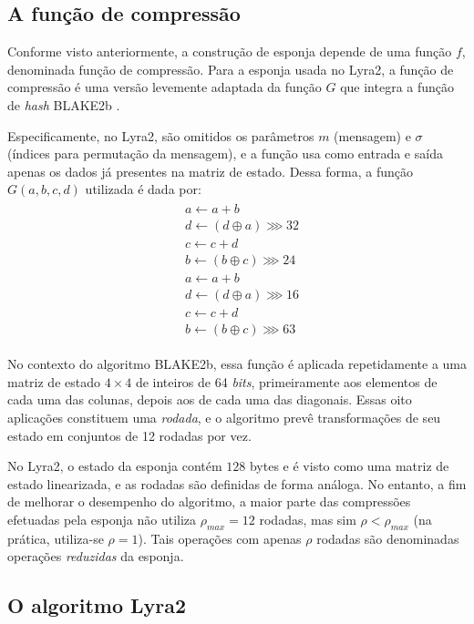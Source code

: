 \documentclass{article}
\begin{document}
\subsection{A função de compressão}\label{sec-compression-fn}

Conforme visto anteriormente, a construção de esponja depende de uma função
$f$, denominada função de compressão. Para a esponja usada no Lyra2, a função
de compressão é uma versão levemente adaptada da função $G$ que integra a
função de \emph{hash} BLAKE2b \cite{blake2b}.

Especificamente, no Lyra2, são omitidos os parâmetros $m$ (mensagem) e $\sigma$
(índices para permutação da mensagem), e a função usa como entrada e saída
apenas os dados já presentes na matriz de estado. Dessa forma, a função $G(a,
b, c, d)$ utilizada é dada por:
\begin{align*}
\begin{split}
& a \leftarrow a + b \\
& d \leftarrow \left(d \oplus a \right) \ggg 32 \\
& c \leftarrow c + d \\
& b \leftarrow \left(b \oplus c \right) \ggg 24 \\
& a \leftarrow a + b \\
& d \leftarrow \left(d \oplus a \right) \ggg 16 \\
& c \leftarrow c + d \\
& b \leftarrow \left(b \oplus c \right) \ggg 63
\end{split}
\end{align*}

No contexto do algoritmo BLAKE2b, essa função é aplicada repetidamente a
uma matriz de estado $4 \times 4$ de inteiros de 64 \emph{bits},
primeiramente aos elementos de cada uma das colunas, depois aos de cada
uma das diagonais. Essas oito aplicações constituem uma \emph{rodada}, e
o algoritmo prevê transformações de seu estado em conjuntos de 12
rodadas por vez.

No Lyra2, o estado da esponja contém $128$ bytes e é visto como uma
matriz de estado linearizada, e as rodadas são definidas de forma
análoga. No entanto, a fim de melhorar o desempenho do algoritmo, a
maior parte das compressões efetuadas pela esponja não utiliza
$\rho_{max} = 12$ rodadas, mas sim $\rho < \rho_{max}$ (na prática,
utiliza-se $\rho = 1$). Tais operações com apenas $\rho$ rodadas são
denominadas operações \emph{reduzidas} da esponja.

\subsection{O algoritmo Lyra2 }\label{sec-lyra2-alg}
\end{document}
